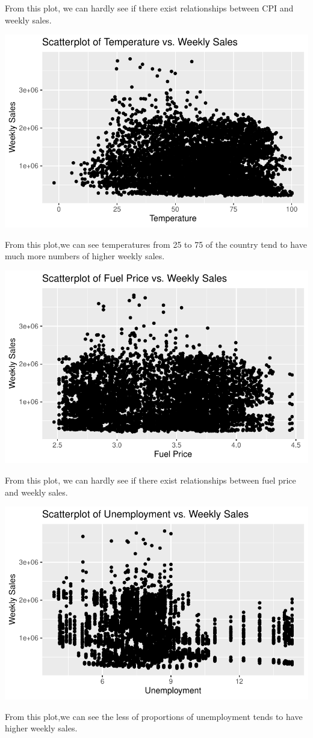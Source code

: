 \documentclass[
  letterpaper,
  DIV=11,
  numbers=noendperiod]{scrartcl}
\begin{document}
From this plot, we can hardly see if there exist relationships between
CPI and weekly sales.

\includegraphics{678final_files/figure-pdf/unnamed-chunk-13-1.pdf}

From this plot,we can see temperatures from 25 to 75 of the country tend
to have much more numbers of higher weekly sales.

\includegraphics{678final_files/figure-pdf/unnamed-chunk-14-1.pdf}

From this plot, we can hardly see if there exist relationships between
fuel price and weekly sales.

\includegraphics{678final_files/figure-pdf/unnamed-chunk-15-1.pdf}

From this plot,we can see the less of proportions of unemployment tends
to have higher weekly sales.
\end{document}
